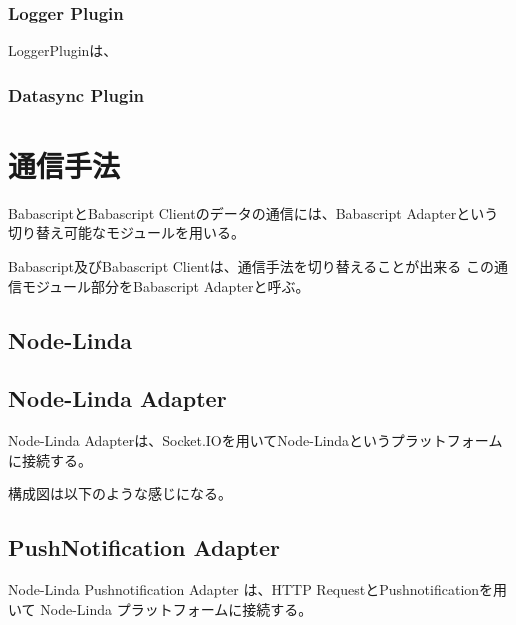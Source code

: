 \subsubsection{Logger Plugin}\label{logger-plugin}

LoggerPluginは、

\subsubsection{Datasync Plugin}\label{datasync-plugin}

\section{通信手法}\label{ux901aux4fe1ux624bux6cd5}

BabascriptとBabascript Clientのデータの通信には、Babascript
Adapterという切り替え可能なモジュールを用いる。

Babascript及びBabascript Clientは、通信手法を切り替えることが出来る
この通信モジュール部分をBabascript Adapterと呼ぶ。

\subsection{Node-Linda}\label{node-linda}

\subsection{Node-Linda Adapter}\label{node-linda-adapter}

Node-Linda
Adapterは、Socket.IOを用いてNode-Lindaというプラットフォームに接続する。

構成図は以下のような感じになる。

\subsection{PushNotification Adapter}\label{pushnotification-adapter}

Node-Linda Pushnotification Adapter は、HTTP
RequestとPushnotificationを用いて Node-Linda
プラットフォームに接続する。
